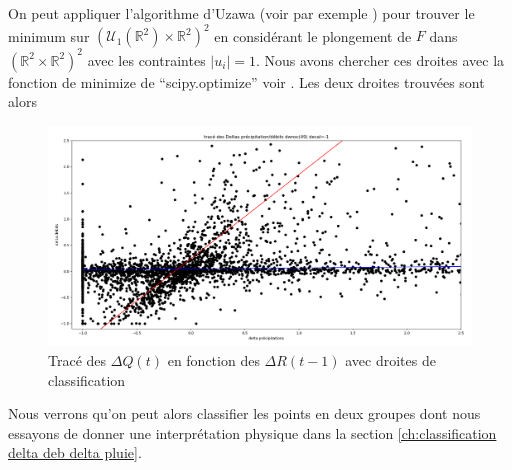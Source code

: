 \documentclass[a4paper,11pt]{article}
\numberwithin{equation}{section}
\begin{document}
On peut appliquer l'algorithme d'Uzawa (voir par exemple \cite{boyd2004convex}) pour trouver le minimum sur  $(\mathcal{U}_1(\mathbb{R}^2)\times\mathbb{R}^2)^2$ en considérant le plongement de $F$ dans  $(\mathbb{R}^2\times\mathbb{R}^2)^2$ avec les contraintes $|u_i|=1$. Nous avons chercher ces droites avec la fonction de minimize de ``scipy.optimize'' voir \cite{scipy}. Les deux droites trouvées sont alors 

\begin{figure}[H]
	\label{fig-deb delta Q delta R avec droites}
	\begin{center}
		\includegraphics[scale=0.28]{deb_prec_dec1_droites.png}
	\end{center}
	\caption{Tracé des $\Delta Q(t)$ en fonction des $\Delta R(t-1)$ avec droites de classification}
\end{figure}

Nous verrons qu'on peut alors classifier les points en deux groupes dont nous essayons de donner une interprétation physique dans la section \ref{ch:classification delta deb delta pluie}.  


\newpage
 

\end{document}
